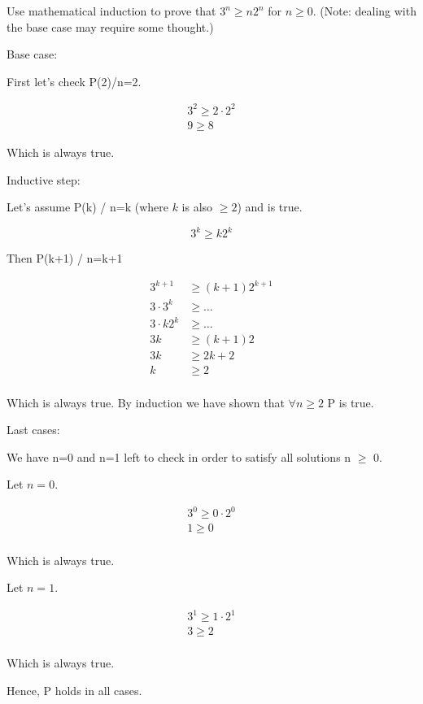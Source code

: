 
\begin{problem}
Use mathematical induction to prove that $3^n \ge n2^n$ for $n\ge 0$. 
(Note: dealing with the base case may require some thought.)
\end{problem}

\begin{solution}
Base case:

First let's check P(2)/n=2.

\begin{gather*}
3^2 \ge 2\cdot2^2 \\
9 \ge 8
\end{gather*}

Which is always true.

\medskip
Inductive step:

Let's assume P(k) / n=k (where $k$ is also $\ge 2$) and is true.

$$3^k \ge k2^k$$

Then P(k+1) / n=k+1

\begin{align*}
3^{k+1} &\ge (k+1)2^{k+1} \\
3\cdot3^k &\ge \ldots   \\
3\cdot k 2^k &\ge \ldots \\
3k &\ge (k+1)2 \\
3k &\ge 2k + 2 \\
k &\ge 2 \\
\end{align*}

Which is always true. By induction we have shown that $\forall n \ge 2$ P is true.

\medskip
Last cases:

We have n=0 and n=1 left to check in order to satisfy all solutions n $\ge$ 0.

Let $n=0$.

\begin{gather*}
3^0 \ge 0\cdot2^0\\
1 \ge 0\\
\end{gather*}

Which is always true.

Let $n=1$.

\begin{gather*}
3^1 \ge 1\cdot2^1\\
3 \ge 2\\
\end{gather*}

Which is always true.

\medskip
Hence, P holds in all cases.

\end{solution}



